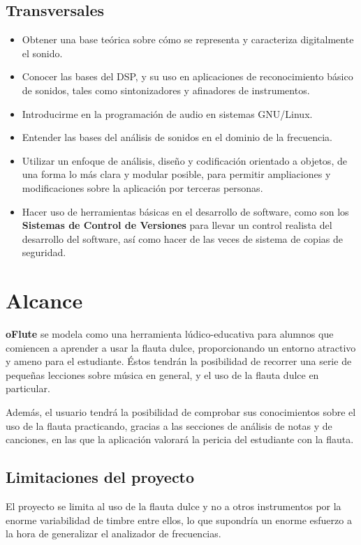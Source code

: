 \subsection{Transversales}
\begin{itemize}
\item Obtener una base teórica sobre cómo se representa y caracteriza
  digitalmente el sonido.
\item Conocer las bases del \ac{DSP}, y su uso en aplicaciones de
  reconocimiento básico de sonidos, tales como sintonizadores y
  afinadores de instrumentos.
\item Introducirme en la programación de audio en sistemas GNU/Linux.
\item Entender las bases del análisis de sonidos en el dominio de la
  frecuencia. 
\item Utilizar un enfoque de análisis, diseño y codificación orientado
  a objetos, de una forma lo más clara y modular posible, para
  permitir ampliaciones y modificaciones sobre la aplicación por
  terceras personas.
\item Hacer uso de herramientas básicas en el desarrollo de software,
  como son los \textbf{Sistemas de Control de Versiones} para llevar
  un control realista del desarrollo del software, así como hacer de
  las veces de sistema de copias de seguridad.
\end{itemize}


\section{Alcance}
\textbf{oFlute} se modela como una herramienta lúdico-educativa para
alumnos que comiencen a aprender a usar la flauta dulce,
proporcionando un entorno atractivo y ameno para el estudiante. Éstos
tendrán la posibilidad de recorrer una serie de pequeñas lecciones
sobre música en general, y el uso de la flauta dulce en particular.

Además, el usuario tendrá la posibilidad de comprobar sus
conocimientos sobre el uso de la flauta practicando, gracias a las
secciones de análisis de notas y de canciones, en las que la
aplicación valorará la pericia del estudiante con la flauta.  

\subsection{Limitaciones del proyecto}
El proyecto se limita al uso de la flauta dulce y no a otros
instrumentos por la enorme variabilidad de timbre entre ellos, lo que
supondría un enorme esfuerzo a la hora de generalizar el analizador de
frecuencias.

